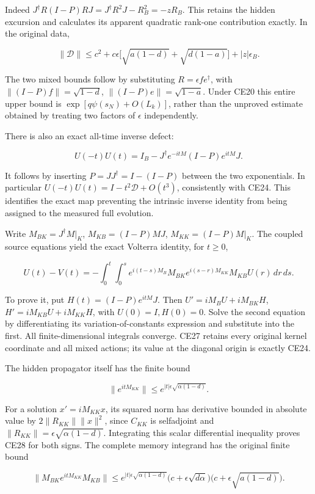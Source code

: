 \documentclass[10pt]{article}
\begin{document}
Indeed \(J^\dagger R(I-P)RJ=J^\dagger R^2J-R_B^2=-zR_B\). This retains the hidden excursion and calculates its apparent quadratic rank-one contribution exactly. In the original data,

\[
\|\mathcal D\|\le c^2+c\epsilon\bigl[\sqrt{a(1-d)}+\sqrt{d(1-a)}\bigr]+|z|\epsilon_B.
\]

The two mixed bounds follow by substituting \(R=\epsilon f e^\dagger\), with \(\|(I-P)f\|=\sqrt{1-d}\), \(\|(I-P)e\|=\sqrt{1-a}\). Under CE20 this entire upper bound is \(\exp[q\psi(s_N)+O(L_k)]\), rather than the unproved estimate obtained by treating two factors of \(\epsilon\) independently.

There is also an exact all-time inverse defect:

\[
\boxed{U(-t)U(t)=I_B-J^\dagger e^{-itM}(I-P)e^{itM}J.} \tag{CE26}
\]

It follows by inserting \(P=JJ^\dagger=I-(I-P)\) between the two exponentials. In particular \(U(-t)U(t)=I-t^2\mathcal D+O(t^3)\), consistently with CE24. This identifies the exact map preventing the intrinsic inverse identity from being assigned to the measured full evolution.

Write \(M_{BK}=J^\dagger M|_K\), \(M_{KB}=(I-P)MJ\), \(M_{KK}=(I-P)M|_K\). The coupled source equations yield the exact Volterra identity, for \(t\ge0\),

\[
\boxed{U(t)-V(t)=-\int_0^t\int_0^s
e^{i(t-s)M_B}M_{BK}e^{i(s-r)M_{KK}}M_{KB}U(r)\,dr\,ds.} \tag{CE27}
\]

To prove it, put \(H(t)=(I-P)e^{itM}J\). Then \(U'=iM_BU+iM_{BK}H\), \(H'=iM_{KB}U+iM_{KK}H\), with \(U(0)=I,H(0)=0\). Solve the second equation by differentiating its variation-of-constants expression and substitute into the first. All finite-dimensional integrals converge. CE27 retains every original kernel coordinate and all mixed actions; its value at the diagonal origin is exactly CE24.

The hidden propagator itself has the finite bound

\[
\|e^{itM_{KK}}\|\le e^{|t|\epsilon\sqrt{\alpha(1-d)}}. \tag{CE28}
\]

For a solution \(x'=iM_{KK}x\), its squared norm has derivative bounded in absolute value by \(2\|R_{KK}\|\|x\|^2\), since \(C_{KK}\) is selfadjoint and \(\|R_{KK}\|=\epsilon\sqrt{\alpha(1-d)}\). Integrating this scalar differential inequality proves CE28 for both signs. The complete memory integrand has the original finite bound

\[
\|M_{BK}e^{itM_{KK}}M_{KB}\|
\le e^{|t|\epsilon\sqrt{\alpha(1-d)}}
\bigl(c+\epsilon\sqrt{d\alpha}\bigr)
\bigl(c+\epsilon\sqrt{a(1-d)}\bigr). \tag{CE29}
\]
\end{document}
